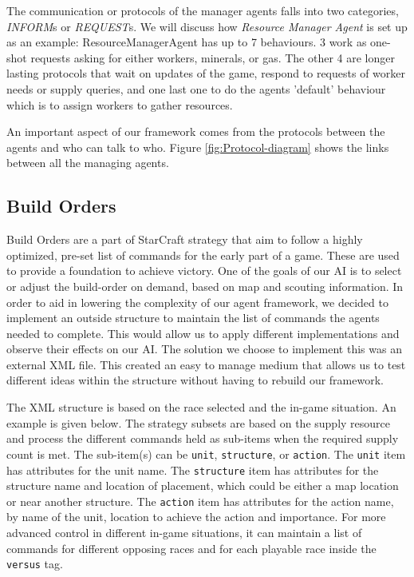 \documentclass[letterpaper]{article}
\begin{document}
The communication or protocols of the manager agents falls into two categories, \emph{INFORM}s or \emph{REQUEST}s. We will discuss how \emph{Resource Manager Agent} is set up as an example:
ResourceManagerAgent has up to 7 behaviours. 3 work as one-shot requests asking for either workers, minerals, or gas. The other 4 are longer lasting protocols that wait on updates of the game, respond to requests of worker needs or supply queries, and one last one to do the agents 'default' behaviour which is to assign workers to gather resources.

An important aspect of our framework comes from the protocols between the agents and who can talk to who.  Figure \ref{fig:Protocol-diagram} shows the links between all the managing agents.


\subsection{Build Orders}
Build Orders are a part of StarCraft strategy that aim to follow a highly optimized, pre-set list of commands for the early part of a game.  These are used to provide a foundation to achieve victory.  One of the goals of our AI is to select or adjust the build-order on demand, based on map and scouting information.  In order to aid in lowering the complexity of our agent framework, we decided to implement an outside structure to maintain the list of commands the agents needed to complete.  This would allow us to apply different implementations and observe their effects on our AI.  The solution we choose to implement this was an external XML file.  This created an easy to manage medium that allows us to test different ideas within the structure without having to rebuild our framework.

The XML structure is based on the race selected and the in-game situation. An example is given below. The strategy subsets are based on the supply resource and process the different commands held as sub-items when the required supply count is met.  The sub-item(s) can be {\tt unit}, {\tt structure}, or {\tt action}.  The {\tt unit} item has attributes for the unit name.  The {\tt structure} item has attributes for the structure name and location of placement, which could be either a map location or near another structure.  The {\tt action} item has attributes for the action name, by name of the unit, location to achieve the action and importance.  For more advanced control in different in-game situations, it can maintain a list of commands for different opposing races and for each playable race inside the {\tt versus} tag.
\end{document}
